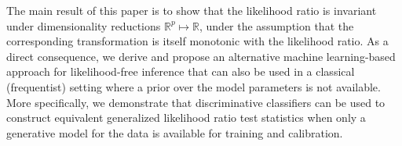 \documentclass[12pt]{article}
\numberwithin{equation}{section}
\theoremstyle{plain}
\begin{document}
The main result of this paper is to show that the likelihood ratio is invariant
under dimensionality reductions $\mathbb{R}^p \mapsto \mathbb{R}$, under the assumption that the corresponding
transformation is itself monotonic with the likelihood ratio. As a direct consequence,
we derive and propose an alternative machine learning-based approach for
likelihood-free inference that can also be used in a classical (frequentist)
setting where a prior over the model parameters is not available. More
specifically, we demonstrate that discriminative classifiers can be used
to construct equivalent generalized likelihood ratio test statistics when only a generative model for
the data is available for training and calibration.

%
%
%
\end{document}

